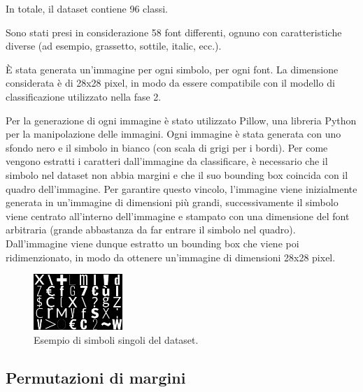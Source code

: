 In totale, il dataset contiene 96 classi.

Sono stati presi in considerazione 58 font differenti, ognuno con caratteristiche diverse (ad esempio, grassetto, sottile, italic, ecc.).

È stata generata un'immagine per ogni simbolo, per ogni font. La dimensione considerata è di 28x28 pixel, in modo da essere compatibile con il modello di classificazione utilizzato nella fase 2.

Per la generazione di ogni immagine è stato utilizzato Pillow, una libreria Python per la manipolazione delle immagini. Ogni immagine è stata generata con uno sfondo nero e il simbolo in bianco (con scala di grigi per i bordi). Per come vengono estratti i caratteri dall'immagine da classificare, è necessario che il simbolo nel dataset non abbia margini e che il suo bounding box coincida con il quadro dell'immagine. Per garantire questo vincolo, l'immagine viene inizialmente generata in un'immagine di dimensioni più grandi, successivamente il simbolo viene centrato all'interno dell'immagine e stampato con una dimensione del font arbitraria (grande abbastanza da far entrare il simbolo nel quadro). Dall'immagine viene dunque estratto un bounding box che viene poi ridimenzionato, in modo da ottenere un'immagine di dimensioni 28x28 pixel.
\begin{figure}[H]
	\centering
	\includegraphics[width=0.3\textwidth]{images/dataset-symbols.png}
	\caption{Esempio di simboli singoli del dataset.}
	\label{fig:dataset-symbols}
\end{figure}

\subsection{Permutazioni di margini}

